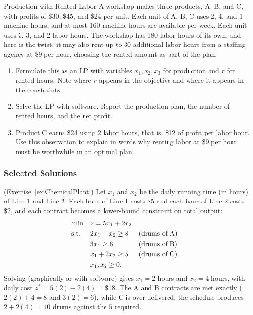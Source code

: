 
\begin{ex}{Production with Rented Labor}{}
\label{ex:rented-labor}
 A workshop makes three products, A, B, and C, with profits of \$30, \$45, and \$24 per unit. Each unit of A, B, C uses 2, 4, and 1 machine-hours, and at most 160 machine-hours are available per week. Each unit uses 3, 3, and 2 labor hours. The workshop has 180 labor hours of its own, and here is the twist: it may also rent up to 30 additional labor hours from a staffing agency at \$9 per hour, choosing the rented amount as part of the plan.
\begin{enumerate}
\item Formulate this as an LP with variables $x_1, x_2, x_3$ for production and $r$ for rented hours. Note where $r$ appears in the objective and where it appears in the constraints.
\item Solve the LP with software. Report the production plan, the number of rented hours, and the net profit.
\item Product C earns \$24 using 2 labor hours, that is, \$12 of profit per labor hour. Use this observation to explain in words why renting labor at \$9 per hour must be worthwhile in an optimal plan.
\end{enumerate}
\end{ex}

\subsubsection*{Selected Solutions}

\begin{solution}(Exercise~\ref{ex:ChemicalPlant})
Let $x_1$ and $x_2$ be the daily running time (in hours) of Line 1 and Line 2.  Each hour of Line 1 costs \$5 and each hour of Line 2 costs \$2, and each contract becomes a lower-bound constraint on total output:
\begin{align*}
\min \quad & z = 5x_1 + 2x_2\\
\text{ s.t. } \quad & 2x_1 + x_2 \geq 8 && \text{(drums of A)}\\
& 3x_1 \geq 6 && \text{(drums of B)}\\
& x_1 + 2x_2 \geq 5 && \text{(drums of C)}\\
& x_1, x_2 \geq 0.
\end{align*}
Solving (graphically or with software) gives $x_1 = 2$ hours and $x_2 = 4$ hours, with daily cost $z^* = 5(2) + 2(4) = \$18$.  The A and B contracts are met exactly ($2(2)+4 = 8$ and $3(2) = 6$), while C is over-delivered: the schedule produces $2 + 2(4) = 10$ drums against the $5$ required.
\end{solution}

